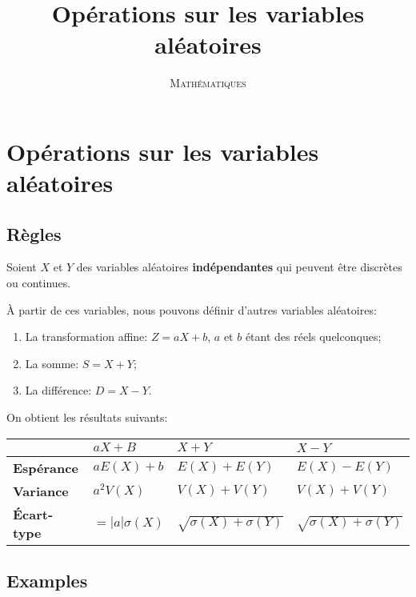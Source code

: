 \documentclass[a4paper,12pt]{scrartcl}
\date{}
\title{Opérations sur les variables aléatoires}
\author{\textsc{Mathématiques}}
\begin{document}
\maketitle

\tableofcontents

\section{Opérations sur les variables aléatoires}

\subsection{Règles}

Soient $X$ et $Y$ des variables aléatoires \textbf{indépendantes} qui peuvent être discrètes ou continues.

À partir de ces variables, nous pouvons définir d'autres variables aléatoires:

\begin{enumerate}
 \item La transformation affine: $Z = aX + b$, $a$ et $b$ étant des réels quelconques;
 \item La somme: $S = X + Y$;
 \item La différence: $D = X - Y$.
\end{enumerate}

On obtient les résultats suivants:

\begin{center}
\begin{tabular}{l|l|l|l|}
\cline{2-4}
 & $aX+B$ & $X+Y$ & $X-Y$ \\ \hline
\multicolumn{1}{|l|}{\textbf{Espérance}} & $aE(X)+ b$ & $E(X)+ E(Y)$ & $E(X)- E(Y)$ \\ \hline
\multicolumn{1}{|l|}{\textbf{Variance}} & $a^2V(X)$ & $V(X) + V(Y)$ & $V(X) + V(Y)$ \\ \hline
\multicolumn{1}{|l|}{\textbf{Écart-type}} & $= |a| \sigma(X)$ & $\sqrt{\sigma(X)+\sigma(Y)}$ & $\sqrt{\sigma(X)+\sigma(Y)}$ \\ \hline
\end{tabular}
\end{center}

\subsection{Examples}
\end{document}
